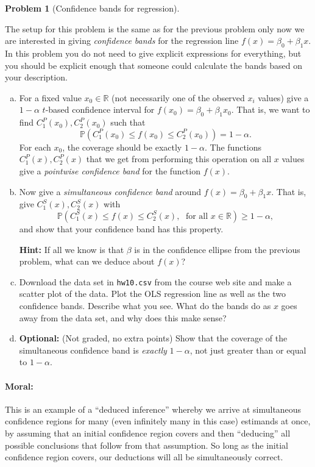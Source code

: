 \documentclass{article}
\newcommand{\PP}{\mathbb{P}}
\newcommand{\RR}{\mathbb{R}}
\newcommand{\optional}{{\bf Optional:} (Not graded, no extra points) }
\theoremstyle{definition}
\newtheorem{problem}{Problem}
\begin{document}
\begin{problem}[Confidence bands for regression]
\label{prob:conf-bands-regression}

The setup for this problem is the same as for the previous problem only now we are interested in giving {\em confidence bands} for the regression line $f(x) = \beta_0 + \beta_1 x$. In this problem you do not need to give explicit expressions for everything, but you should be explicit enough that someone could calculate the bands based on your description.

\begin{enumerate}[(a)]
\item For a fixed value $x_0 \in \RR$ (not necessarily one of the observed $x_i$ values) give a $1-\alpha$ $t$-based confidence interval for $f(x_0) = \beta_0 + \beta_1 x_0$. That is, we want to find $C_1^P(x_0), C_2^P(x_0)$ such that
\[
\PP\left(C_1^P(x_0) \leq f(x_0) \leq C_2^P(x_0)\right) = 1-\alpha.
\]
For each $x_0$, the coverage should be exactly $1-\alpha$. The functions $C_1^P(x), C_2^P(x)$ that we get from performing this operation on all $x$ values give a {\em pointwise confidence band} for the function $f(x)$.



\item Now give a {\em simultaneous confidence band} around $f(x) = \beta_0 + \beta_1 x$. That is, give $C_1^S(x), C_2^S(x)$ with
\[
\PP\left(C_1^S(x) \leq f(x) \leq C_2^S(x), \; \text{ for all } x\in\RR\right) \geq 1-\alpha,
\]
and show that your confidence band has this property.

{\bf Hint:} If all we know is that $\beta$ is in the confidence ellipse from the previous problem, what can we deduce about $f(x)$?



\item Download the data set in \texttt{hw10.csv} from the course web site and make a scatter plot of the data. Plot the OLS regression line as well as the two confidence bands. Describe what you see. What do the bands do as $x$ goes away from the data set, and why does this make sense?



\item \optional Show that the coverage of the simultaneous confidence band is {\em exactly} $1-\alpha$, not just greater than or equal to $1-\alpha$.



\end{enumerate}

\paragraph{Moral:} This is an example of a ``deduced inference'' whereby we arrive at simultaneous confidence regions for many (even infinitely many in this case) estimands at once, by assuming that an initial confidence region covers and then ``deducing'' all possible conclusions that follow from that assumption. So long as the initial confidence region covers, our deductions will all be simultaneously correct.
\end{problem}
\end{document}
